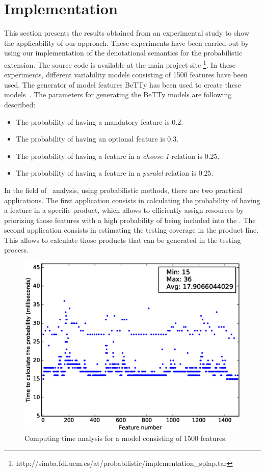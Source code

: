 
\section{Implementation}
\label{sec:stat:impl}

This section presents the results obtained from an experimental study to show the applicability of our 
approach. These experiments have been carried out by using our implementation of the denotational 
semantics for the probabilistic extension. The source code is available at the main project site 
\footnote{http://simba.fdi.ucm.es/at/probabilistic/implementation\_splap.tar}. In these experiments, 
different variability models consisting of 1500 features have been used. The generator of model 
features BeTTy has been used to create these models~\cite{SeguraHBC11}. The parameters for 
generating the BeTTy models are following described:

\begin{itemize}
	\item The probability of having a mandatory feature is 0.2.
	\item The probability of having an optional feature is 0.3.
	\item The probability of having a feature in a \emph{choose-1} relation is 0.25.
	\item The probability of having a feature in a \emph{paralel} relation is 0.25.
\end{itemize}

In the field of \SPLs\ analysis, using probabilistic methods, there are two practical applications. The first
application consists in calculating the probability of having a feature in a specific product, which allows to 
efficiently assign resources by priorizing those features with a high probability of being included into 
the \SPL. The second application consists in estimating the testing coverage in the product line. This 
allows to calculate those products that can be generated in the testing process.

\begin{figure}[h]
	\centering
	\linefigure
	\includegraphics[width=0.8\hsize,angle=0]{plot_probs_times.eps}
	\linefigure
	\caption{Computing time analysis for a model consisting of 1500 features.}\label{fig:plot:probs:times}
\end{figure}

